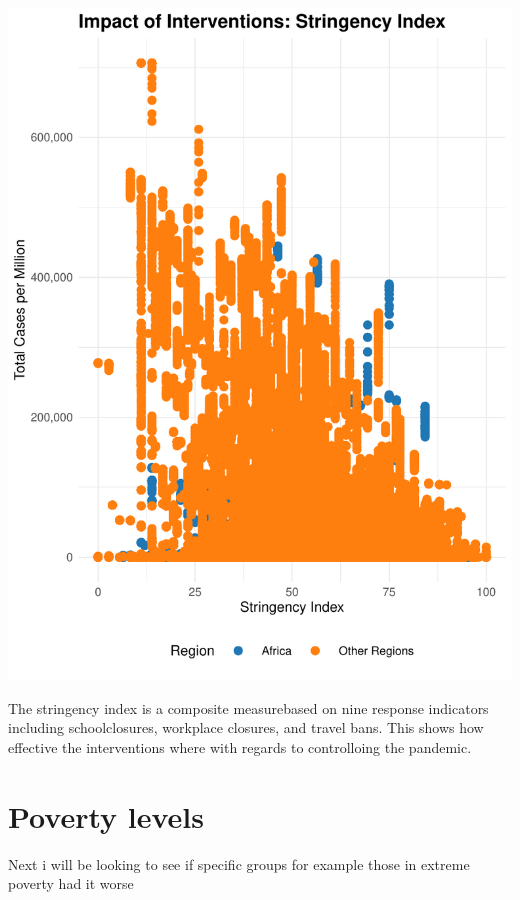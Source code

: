 \documentclass[12pt,preprint, authoryear]{elsarticle}
\let\origfigure\figure
\let\endorigfigure\endfigure
\renewenvironment{figure}[1][2] {
    \expandafter\origfigure\expandafter[H]
} {
    \endorigfigure
}
\numberwithin{equation}{section}
\numberwithin{figure}{section}
\numberwithin{table}{section}
\begin{document}
\begin{figure}[H]

{\centering \includegraphics{Q1_files/figure-latex/Figure8-1} 

}

\caption{ Ave cases vs vaccinated  \label{Figure8 }}\label{fig:Figure8}
\end{figure}

The stringency index is a composite measurebased on nine response
indicators including schoolclosures, workplace closures, and travel
bans. This shows how effective the interventions where with regards to
controlloing the pandemic.

\hypertarget{poverty-levels}{%
\section{Poverty levels}\label{poverty-levels}}

Next i will be looking to see if specific groups for example those in
extreme poverty had it worse
\end{document}
